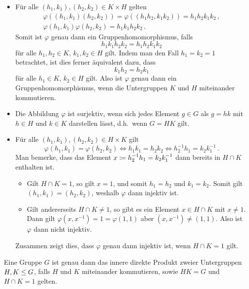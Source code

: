 \begin{itemize}
  \item
    Für alle $(h_1, k_1), (h_2, k_2) \in K \times H$ gelten
    \begin{gather*}
        \varphi((h_1, k_1) (h_2, k_2))
      = \varphi((h_1 h_2, k_1 k_2))
      = h_1 h_2 k_1 k_2 \,,
      \\
        \varphi(h_1, k_1) \varphi(h_2, k_2)
      = h_1 k_1 h_2 k_2 \,.
    \end{gather*}
    Somit ist $\varphi$ genau dann ein Gruppenhomomorphismus, falls
    \[
        h_1 k_1 h_2 k_2
      = h_1 h_2 k_1 k_2
    \]
    für alle $h_1, h_2 \in K$, $k_1, k_2 \in H$ gilt.
    Indem man den Fall $h_1 = k_2 = 1$ betrachtet, ist dies ferner äquivalent dazu, dass
    \[
        k_1 h_2
      = h_2 k_1
    \]
    für alle $h_1 \in K$, $k_2 \in H$ gilt.
    Also ist $\varphi$ genau dann ein Gruppenhomomorphismus, wenn die Untergruppen $K$ und $H$ miteinander kommutieren.
    
  \item
    Die Abbildung $\varphi$ ist surjektiv, wenn sich jedes Element $g \in G$ als $g = hk$ mit $h \in H$ und $k \in K$ darstellen lässt, d.h.\ wenn $G = HK$ gilt.
    
  \item
    Für alle $(h_1, k_1), (h_2, k_2) \in H \times K$ gilt
    \[
            \varphi(h_1, k_1) = \varphi(h_2, k_2)
      \iff  h_1 k_1 = h_2 k_2
      \iff  h_2^{-1} h_1 = k_2 k_1^{-1} \,.
    \]
    Man bemerke, dass das Element $x \coloneqq h_2^{-1} h_1 = k_2 k_1^{-1}$ dann bereits in $H \cap K$ enthalten ist.
    
    \begin{itemize}
      \item
        Gilt $H \cap K = 1$, so gilt $x = 1$, und somit $h_1 = h_2$ und $k_1 = k_2$.
        Somit gilt $(h_1, k_1) = (h_2, k_2)$, weshalb $\varphi$ dann injektiv ist.
      \item
        Gilt andererseits $H \cap K \neq 1$, so gibt es ein Element $x \in H \cap K$ mit $x \neq 1$.
        Dann gilt $\varphi(x, x^{-1}) = 1 = \varphi(1,1)$ aber $(x, x^{-1}) \neq (1,1)$.
        Also ist $\varphi$ dann nicht injektiv.
    \end{itemize}
    
    Zusammen zeigt dies, dass $\varphi$ genau dann injektiv ist, wenn $H \cap K = 1$ gilt.
\end{itemize}

\begin{proposition}
  \label{proposition: first characterization}
  Eine Gruppe $G$ ist genau dann das innere direkte Produkt zweier Untergruppen $H, K \leq G$, falls $H$ und $K$ miteinander kommutieren, sowie $HK = G$ und $H \cap K = 1$ gelten.
\end{proposition}





